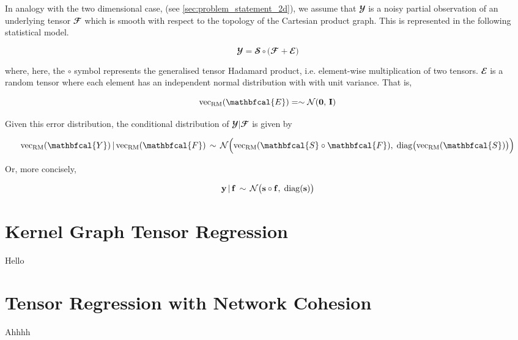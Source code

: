 In analogy with the two dimensional case, (see \cref{sec:problem_statement_2d}), we assume that $\mathbfcal{Y}$ is a noisy partial observation of an underlying tensor $\mathbfcal{F}$ which is smooth with respect to the topology of the Cartesian product graph. This is represented in the following statistical model. 

\begin{equation}
    \mathbfcal{Y} = \mathbfcal{S} \circ \big(\mathbfcal{F} + \mathbfcal{E} \big)
\end{equation}

where, here, the $\circ$ symbol represents the generalised tensor Hadamard product, i.e. element-wise multiplication of two tensors. $\mathbfcal{E}$ is a random tensor where each element has an independent normal distribution with with unit variance. That is,

\begin{equation}
    \vecrm{\mathbfcal{E}} = \sim \mathcal{N}(\mathbf{0}, \, \I)
\end{equation}

Given this error distribution, the conditional distribution of $\mathbfcal{Y} |  \mathbfcal{F}$ is given by 

\begin{equation}
    \vecrm{\mathbfcal{Y}} \, | \, \vecrm{\mathbfcal{F}} \, \sim \, \mathcal{N}\Big(\vecrm{\mathbfcal{S} \circ \mathbfcal{F}}, \; \Diag{\vecrm{\mathbfcal{S}}}\Big)
\end{equation}

Or, more concisely, 

\begin{equation}
    \mathbf{y} \, | \, \mathbf{f} \, \sim \, \mathcal{N}\big(\mathbf{s} \circ \mathbf{f}, \; \text{\textup{diag}}(\mathbf{s})\big)
\end{equation}


\section{Kernel Graph Tensor Regression}

Hello

\section{Tensor Regression with Network Cohesion}

Ahhhh

